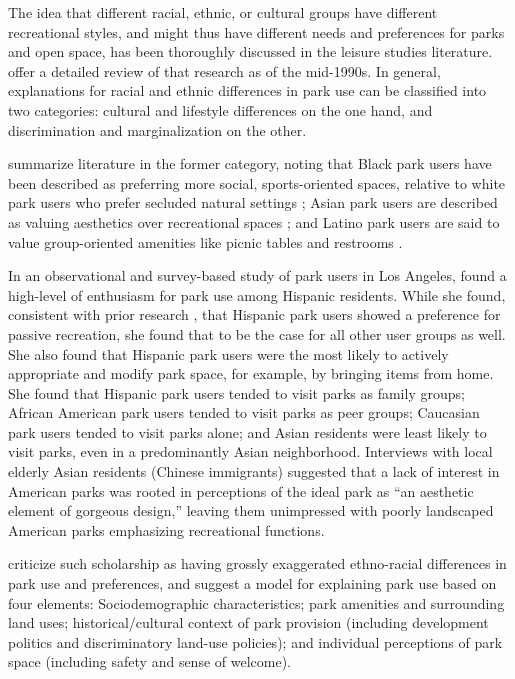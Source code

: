 \documentclass[3p, authoryear, review, doubleblind]{elsarticle} %
\begin{document}
The idea that different racial, ethnic, or cultural groups have different
recreational styles, and might thus have different needs and preferences for
parks and open space, has been thoroughly discussed in the leisure studies
literature. \citet{husbands1995ethnicity} offer a detailed review of that research as
of the mid-1990s. In general, explanations for racial and ethnic differences in
park use can be classified into two categories: cultural and lifestyle
differences on the one hand, and discrimination and marginalization on the
other.

\citet{byrne2009nature} summarize literature in the former category, noting that Black
park users have been described as preferring more social, sports-oriented
spaces, relative to white park users who prefer secluded natural settings
\citep{washburne1978black, hutchison1987ethnicity, floyd1999convergence, gobster2002managing, payne2002examination, ho2005gender}; Asian park users
are described as valuing aesthetics over recreational spaces
\citep{gobster2002managing, payne2002examination, ho2005gender}; and Latino park
users are said to value group-oriented amenities like picnic tables and
restrooms \citep{baas1993influence, hutchison1987ethnicity, irwin1990mexican}.

In an observational and survey-based study of park users in Los Angeles,
\citet{loukaitou1995urban} found a high-level of enthusiasm for park use among Hispanic
residents. While she found, consistent with prior research
\citep{baas1993influence, hutchison1987ethnicity, irwin1990mexican}, that
Hispanic park users showed a preference for passive recreation, she found that
to be the case for all other user groups as well. She also found that Hispanic
park users were the most likely to actively appropriate and modify park space,
for example, by bringing items from home. She found that Hispanic park users
tended to visit parks as family groups; African American park users tended to
visit parks as peer groups; Caucasian park users tended to visit parks alone;
and Asian residents were least likely to visit parks, even in a predominantly
Asian neighborhood. Interviews with local elderly Asian residents (Chinese
immigrants) suggested that a lack of interest in American parks was rooted in
perceptions of the ideal park as ``an aesthetic element of gorgeous design,''
leaving them unimpressed with poorly landscaped American parks emphasizing
recreational functions.

\citet{byrne2009nature} criticize such scholarship as having grossly exaggerated
ethno-racial differences in park use and preferences, and suggest a model for
explaining park use based on four elements: Sociodemographic characteristics;
park amenities and surrounding land uses; historical/cultural context of park
provision (including development politics and discriminatory land-use
policies); and individual perceptions of park space (including safety and
sense of welcome).
\end{document}
